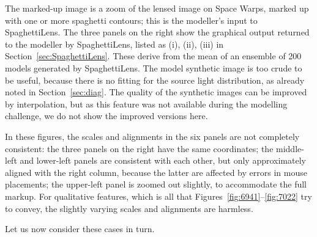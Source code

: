 \documentclass[usenatbib]{mn2e}
\newcommand{\spl}{SpaghettiLens\xspace}
\newcommand{\sw}{Space Warps\xspace}
\newcommand{\secref}[1]{Section~\ref{sec:#1}}
\begin{document}
\FloatBarrier

\noindent The marked-up image is a zoom of the lensed image on \sw,
marked up with one or more spaghetti contours; this is the modeller's
input to \spl.  The three panels on the right show the graphical
output returned to the modeller by \spl, listed as (i), (ii), (iii) in
\secref{SpaghettiLens}.  These derive from the mean of an ensemble of
200 models generated by \spl. The model synthetic image is too crude
to be useful, because there is no fitting for the source light
distribution, as already noted in \secref{diag}.  The quality of the
synthetic images can be improved by interpolation, but as this feature
was not available during the modelling challenge, we do not show the
improved versions here.

%
In these figures, the scales and alignments in the six panels are not
completely consistent: the three panels on the right have the same
coordinates; the middle-left and lower-left panels are consistent with
each other, but only approximately aligned with the right column,
because the latter are affected by errors in mouse placements; the
upper-left panel is zoomed out slightly, to accommodate the full
markup.  For qualitative features, which is all that
Figures~\ref{fig:6941}--\ref{fig:7022} try to convey, the slightly
varying scales and alignments are harmless.



Let us now consider these cases in turn.
\end{document}
